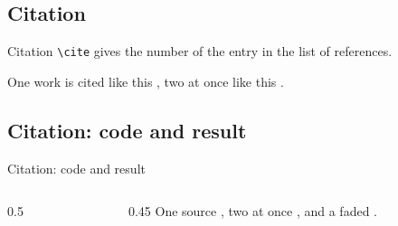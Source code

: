 \subsection{Citation}
\begin{frame}{Citation}
    \verb|\cite| gives the number of the entry in the list of references.

    One work is cited like this \cite{p1}, two at once like this \cite{p1,p2}.
\end{frame}

\subsection{Citation: code and result}
\begin{frame}{Citation: code and result}
\begin{columns}[T,onlytextwidth]
\begin{column}{0.5\textwidth}
\begin{codeonly}
\cite{p1}
\cite{p1,p2}
\end{codeonly}
\smallskip
{}
\begin{codeonly}
\end{codeonly}
\smallskip
{}
\begin{codeonly}
\end{codeonly}
\end{column}
\begin{column}{0.45\textwidth}
\stepoffset
One source \cite{p1}, two at once \cite{p1,p2}, and a faded .
\end{column}
\end{columns}
\end{frame}
